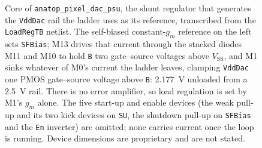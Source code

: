 \begin{figure}[htbp]
{\begin{circuitikz}
\end{circuitikz}
  }
  \caption[{Core of the DAC supply block.}]{Core of \texttt{anatop\_pixel\_dac\_psu}, the shunt regulator that generates the \texttt{VddDac} rail the ladder uses as its reference, transcribed from the \texttt{LoadRegTB} netlist. The self-biased constant-$g_m$ reference on the left sets \texttt{SFBias}; M13 drives that current through the stacked diodes M11 and M10 to hold \texttt{B} two gate--source voltages above $V_{\mathrm{SS}}$, and M1 sinks whatever of M0's current the ladder leaves, clamping \texttt{VddDac} one PMOS gate--source voltage above \texttt{B}: \SI{2.177}{\volt} unloaded from a \SI{2.5}{\volt} rail. There is no error amplifier, so load regulation is set by M1's $g_m$ alone. The five start-up and enable devices (the weak pull-up and its two kick devices on \texttt{SU}, the shutdown pull-up on \texttt{SFBias} and the \texttt{En} inverter) are omitted; none carries current once the loop is running. Device dimensions are proprietary and are not stated.}
  \label{fig:dacr2r12-psu}
\end{figure}

